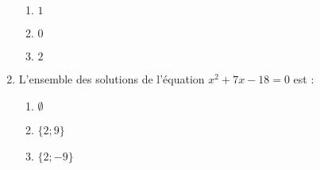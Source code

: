 \documentclass[oneside,twocolumn,landscape]{book}
\begin{document}
\begin{enumerate}
\begin{enumerate}

\item\BonneReponse $1$
\item\MauvaiseReponse $0$


\item\MauvaiseReponse $2$

\end{enumerate}



\item L'ensemble des solutions de l'équation $x^{2}+7 x-18=0$ est :

\begin{enumerate}

\item\MauvaiseReponse $\emptyset$


\item\MauvaiseReponse $\{2 ; 9\}$
\item\BonneReponse $\{2 ;-9\}$

\end{enumerate}








\end{enumerate}
\end{document}
